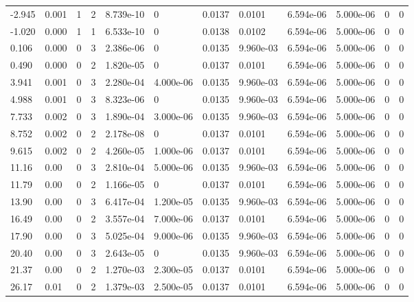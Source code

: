 \documentclass[preview]{standalone}
\begin{document}
{{\begin{tabular}{L{1.2cm}C{1.2cm} C{0.3cm}C{0.5cm} C{1.4cm}C{1.4cm} C{1.4cm}C{1.4cm} C{1.6cm}C{1.6cm} C{1.6cm}C{1.6cm}}
  -2.945  &  0.001  & 1     &  2 &  8.739e-10  & 0  &  0.0137&   0.0101& 6.594e-06 & 5.000e-06   &  0 & 0  \\ 
  -1.020  &  0.000  & 1     &  1 &  6.533e-10  & 0  &  0.0138&   0.0102& 6.594e-06 & 5.000e-06   &  0 & 0  \\ 
  0.106  &  0.000  & 0     &  3 &  2.386e-06  & 0  &  0.0135&   9.960e-03& 6.594e-06 & 5.000e-06   &  0 & 0  \\ 
  0.490  &  0.000  & 0     &  2 &  1.820e-05  & 0  &  0.0137&   0.0101& 6.594e-06 & 5.000e-06   &  0 & 0  \\ 
  3.941  &  0.001  & 0     &  3 &  2.280e-04  & 4.000e-06  &  0.0135&   9.960e-03& 6.594e-06 & 5.000e-06   &  0 & 0  \\ 
  4.988  &  0.001  & 0     &  3 &  8.323e-06  & 0  &  0.0135&   9.960e-03& 6.594e-06 & 5.000e-06   &  0 & 0  \\ 
  7.733  &  0.002  & 0     &  3 &  1.890e-04  & 3.000e-06  &  0.0135&   9.960e-03& 6.594e-06 & 5.000e-06   &  0 & 0  \\ 
  8.752  &  0.002  & 0     &  2 &  2.178e-08  & 0  &  0.0137&   0.0101& 6.594e-06 & 5.000e-06   &  0 & 0  \\ 
  9.615  &  0.002  & 0     &  2 &  4.260e-05  & 1.000e-06  &  0.0137&   0.0101& 6.594e-06 & 5.000e-06   &  0 & 0  \\ 
  11.16  &  0.00  & 0     &  3 &  2.810e-04  & 5.000e-06  &  0.0135&   9.960e-03& 6.594e-06 & 5.000e-06   &  0 & 0  \\ 
  11.79  &  0.00  & 0     &  2 &  1.166e-05  & 0  &  0.0137&   0.0101& 6.594e-06 & 5.000e-06   &  0 & 0  \\ 
  13.90  &  0.00  & 0     &  3 &  6.417e-04  & 1.200e-05  &  0.0135&   9.960e-03& 6.594e-06 & 5.000e-06   &  0 & 0  \\ 
  16.49  &  0.00  & 0     &  2 &  3.557e-04  & 7.000e-06  &  0.0137&   0.0101& 6.594e-06 & 5.000e-06   &  0 & 0  \\ 
  17.90  &  0.00  & 0     &  3 &  5.025e-04  & 9.000e-06  &  0.0135&   9.960e-03& 6.594e-06 & 5.000e-06   &  0 & 0  \\ 
  20.40  &  0.00  & 0     &  3 &  2.643e-05  & 0  &  0.0135&   9.960e-03& 6.594e-06 & 5.000e-06   &  0 & 0  \\ 
  21.37  &  0.00  & 0     &  2 &  1.270e-03  & 2.300e-05  &  0.0137&   0.0101& 6.594e-06 & 5.000e-06   &  0 & 0  \\ 
  26.17  &  0.01  & 0     &  2 &  1.379e-03  & 2.500e-05  &  0.0137&   0.0101& 6.594e-06 & 5.000e-06   &  0 & 0  \\ 

\end{tabular}}}
\end{document}
